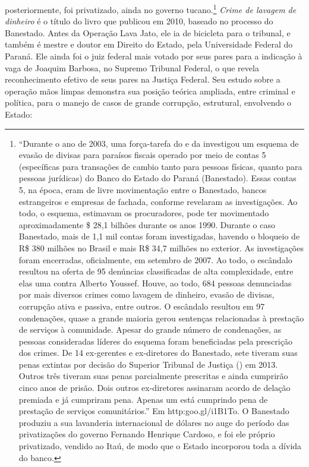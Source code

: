 posteriormente, foi privatizado, ainda no governo tucano.\footnote{``Durante
  o ano de 2003, uma força-tarefa do  e da  investigou um esquema
  de evasão de divisas para paraísos fiscais operado por meio de contas
  5 (específicas para transações de cambio tanto para pessoas físicas,
  quanto para pessoas jurídicas) do Banco do Estado do Paraná
  (Banestado). Essas contas 5, na época, eram de livre movimentação
  entre o Banestado, bancos estrangeiros e empresas de fachada, conforme
  revelaram as investigações. Ao todo, o esquema, estimavam os
  procuradores, pode ter movimentado aproximadamente \$ 28,1 bilhões
  durante os anos 1990. Durante o caso Banestado, mais de 1,1 mil contas
  foram investigadas, havendo o bloqueio de R\$ 380 milhões no Brasil e
  mais R\$ 34,7 milhões no exterior. As investigações foram encerradas,
  oficialmente, em setembro de 2007. Ao todo, o escândalo resultou na
  oferta de 95 denúncias classificadas de alta complexidade, entre elas
  uma contra Alberto Youssef. Houve, ao todo, 684 pessoas denunciadas por
  mais diversos crimes como lavagem de dinheiro, evasão de divisas,
  corrupção ativa e passiva, entre outros. O escândalo resultou em 97
  condenações, quase a grande maioria gerou sentenças relacionadas à
  prestação de serviços à comunidade. Apesar do grande número de
  condenações, as pessoas consideradas líderes do esquema foram
  beneficiadas pela prescrição dos crimes. De 14 ex-gerentes e
  ex-diretores do Banestado, sete tiveram suas penas extintas por
  decisão do Superior Tribunal de Justiça () em 2013. Outros três
  tiveram suas penas parcialmente prescritas e ainda cumprirão cinco
  anos de prisão. Dois outros ex-diretores assinaram acordo de delação
  premiada e já cumpriram pena. Apenas um está cumprindo pena de
  prestação de serviços comunitários.'' Em
  http:goo.gl/i1B1To.
  O Banestado produziu a sua lavanderia internacional de dólares no auge
  do período das privatizações do governo Fernando Henrique Cardoso, e
  foi ele próprio privatizado, vendido ao Itaú, de modo que o Estado
  incorporou toda a dívida do banco.} \emph{Crime de lavagem de
dinheiro} é o título do livro que publicou em 2010, baseado no processo
do Banestado. Antes da Operação Lava Jato, ele ia de bicicleta para o
tribunal, e também é mestre e doutor em Direito do Estado, pela
Universidade Federal do Paraná. Ele ainda foi o juiz federal mais votado
por seus pares para a indicação à vaga de Joaquim Barbosa, no Supremo
Tribunal Federal, o que revela reconhecimento efetivo de seus pares na
Justiça Federal. Seu estudo sobre a operação mãos limpas demonstra sua
posição teórica ampliada, entre criminal e política, para o manejo de
casos de grande corrupção, estrutural, envolvendo o Estado:

